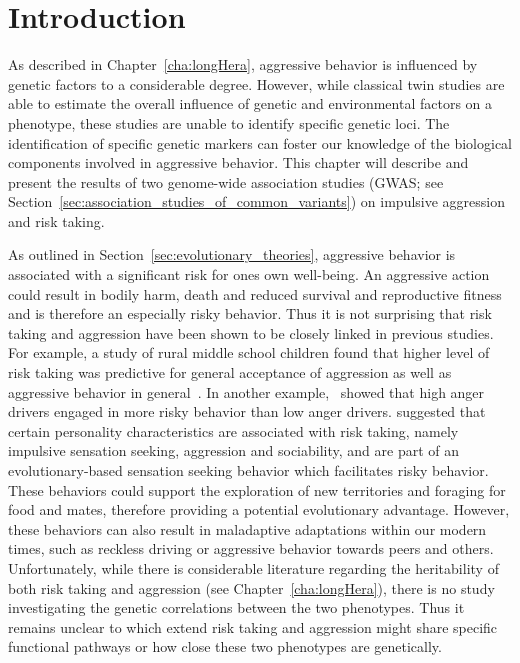 \section{Introduction}
\label{sec:introduction_assoc}

As described in Chapter~\ref{cha:longHera}, aggressive behavior is influenced by genetic factors to a considerable degree.
However, while classical twin studies are able to estimate the overall influence of genetic and environmental factors on a phenotype, these studies are unable to identify specific genetic loci.
The identification of specific genetic markers can foster our knowledge of the biological components involved in aggressive behavior. 
This chapter will describe and present the results of two genome-wide association studies (GWAS; see Section~\ref{sec:association_studies_of_common_variants}) on impulsive aggression and risk taking.

As outlined in Section~\ref{sec:evolutionary_theories}, aggressive behavior is associated with a significant risk for ones own well-being.
An aggressive action could result in bodily harm, death and reduced survival and reproductive fitness and is therefore an especially risky behavior.
Thus it is not surprising that risk taking and aggression have been shown to be closely linked in previous studies.
For example, a study of rural middle school children found that higher level of risk taking was  predictive for general acceptance of aggression as well as aggressive behavior in general~\cite{Swaim2004}.
In another example,~\citet{Deffenbacher2003} showed that high anger drivers engaged in more risky behavior than low anger drivers.
\citet{Zuckerman2000} suggested that certain personality characteristics are associated with risk taking, namely impulsive sensation seeking, aggression and sociability, and are part of an evolutionary-based sensation seeking behavior which facilitates risky behavior.
These behaviors could support the exploration of new territories and foraging for food and mates,
therefore providing a potential evolutionary advantage.
However, these behaviors can also result in maladaptive adaptations within our modern times, such as reckless driving or aggressive behavior towards peers and others.
Unfortunately, while there is considerable literature regarding the heritability of both risk taking and aggression (see Chapter~\ref{cha:longHera}), there is no study investigating the genetic correlations between the two phenotypes.
Thus it remains unclear to which extend risk taking and aggression might share specific functional pathways or how close these two phenotypes are genetically.


